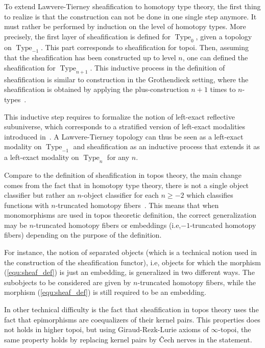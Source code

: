\documentclass[conference]{IEEEtran}
\newcommand{\ie}{i.e,\xspace}
\DeclareMathOperator{\Type}{Type}
\begin{document}
To extend Lawvere-Tierney sheafification to homotopy type theory, the
first thing to realize is that the construction can not be done in one
single step anymore. It must rather be performed by induction on the
level of homotopy types. More precisely, the first layer of
sheafification is defined for $\Type_{0}$, given a topology on
$\Type_{-1}$. This part corresponds to sheafification for topoi. Then,
assuming that the sheafification has been constructed up to level $n$,
one can defined the sheafification for $\Type_{n+1}$.
%
This inductive process in the definition of sheafification is similar
to construction in the Grothendieck setting, where the
sheafification is obtained by applying the plus-construction $n+1$
times to
$n$-types~\cite[Chapter~6]{lurie}.

This inductive step requires to formalize the notion of left-exact
reflective subuniverse, which corresponds to a stratified version of
left-exact modalities introduced in~\cite[Chapter~7]{hottbook}. A
Lawvere-Tierney topology can thus be seen as a left-exact modality on
$\Type_{-1}$ and sheafification as an inductive process that extends
it as a left-exact modality on $\Type_{n}$ for any $n$.

Compare to the definition of sheafification in topos theory, the main
change comes from the fact that in homotopy type theory, there is not
a single object classifier but rather an $n$-object classifier for
each $n\geq -2$ which classifies functions with $n$-truncated homotopy
fibers~\cite{sets_in_hott}. This means that when monomorphisms are used in topos
theoretic definition, the correct generalization may be $n$-truncated homotopy
fibers or embeddings (\ie $-1$-truncated homotopy
fibers) depending on the purpose of the definition.

For instance, the notion of separated objects (which is a technical
notion used in the construction of the sheafification functor), \ie
objects for which the morphism
(\ref{equ:sheaf_def}) is just an embedding, is generalized in two
different ways.  
%
The subobjects to be considered are given by $n$-truncated homotopy fibers,
while the morphism (\ref{equ:sheaf_def}) is still required to be an
embedding.

In other technical difficulty is the fact that sheafification in topos
theory uses the fact that epimorphisms are coequalizers of their
kernel pairs. This properties does not holds in higher topoi, but
using Giraud-Rezk-Lurie axioms of $\infty$-topoi, the same property
holds by replacing kernel pairs by \v{C}ech nerves in the statement.
\end{document}
